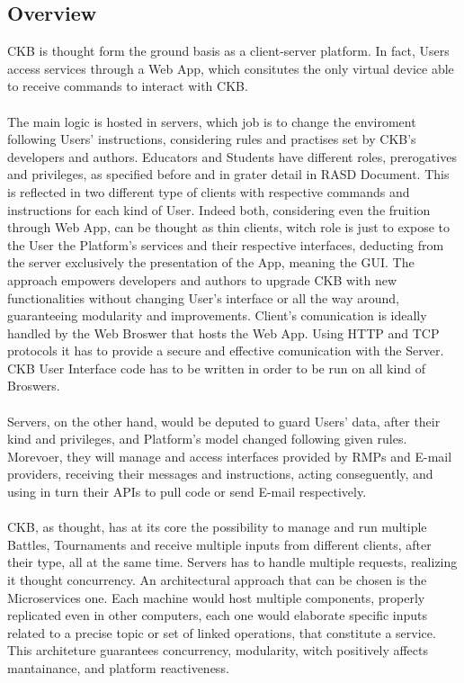 \subsection{Overview}
CKB is thought form the ground basis as a client-server platform. In fact, Users access services through a Web App, which consitutes the only virtual device able to receive commands to interact with CKB.\\\\
The main logic is hosted in servers, which job is to change the enviroment following Users' instructions, considering rules and practises set by CKB's developers and authors.
Educators and Students have different roles, prerogatives and privileges, as specified before and in grater detail in RASD Document. This is reflected in two different type of clients with respective commands and instructions for each kind of User.
Indeed both, considering even the fruition through Web App, can be thought as thin clients, witch role is just to expose to the User the Platform's services and their respective interfaces, deducting from the server exclusively the presentation of the App, meaning the GUI.
The approach empowers developers and authors to upgrade CKB with new functionalities without changing User's interface or all the way around, guaranteeing modularity and improvements.
Client's comunication is ideally handled by the Web Broswer that hosts the Web App. Using HTTP and TCP protocols it has to provide a secure and effective comunication with the Server. CKB User Interface code has to be written in order to be run on all kind of Broswers.\\\\
Servers, on the other hand, would be deputed to guard Users' data, after their kind and privileges, and Platform's model changed following given rules. Morevoer, they will manage and access interfaces provided by RMPs and E-mail providers, receiving their messages and instructions, acting conseguently, and using in turn their APIs to pull code or send E-mail respectively.\\\\
CKB, as thought, has at its core the possibility to manage and run multiple Battles, Tournaments and receive multiple inputs from different clients, after their type, all at the same time. Servers has to handle multiple requests, realizing it thought concurrency. An architectural approach that can be chosen is the Microservices one. 
Each machine would host multiple components, properly replicated even in other computers, each one would elaborate specific inputs related to a precise topic or set of linked operations, that constitute a service. This architeture guarantees concurrency, modularity, witch positively affects mantainance, and platform reactiveness.\\\\
